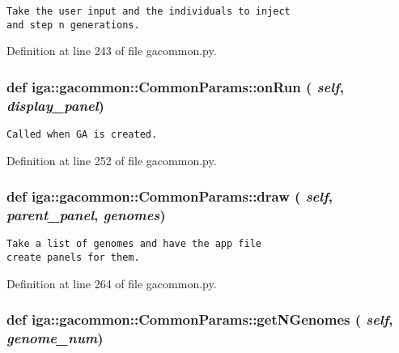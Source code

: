 \footnotesize\begin{verbatim}
Take the user input and the individuals to inject
and step n generations.
\end{verbatim}
\normalsize
 

Definition at line 243 of file gacommon.py.
\subsubsection{\setlength{\rightskip}{0pt plus 5cm}def iga::gacommon::CommonParams::onRun ( {\em self},  {\em display\_\-panel})}\label{classiga_1_1gacommon_1_1CommonParams_7383f6673e7687124dffaedf1a35f9b3}




\footnotesize\begin{verbatim}
Called when GA is created.
\end{verbatim}
\normalsize
 

Definition at line 252 of file gacommon.py.
\subsubsection{\setlength{\rightskip}{0pt plus 5cm}def iga::gacommon::CommonParams::draw ( {\em self},  {\em parent\_\-panel},  {\em genomes})}\label{classiga_1_1gacommon_1_1CommonParams_e33a52182911436bee817af6b574abb0}




\footnotesize\begin{verbatim}
Take a list of genomes and have the app file
create panels for them.
\end{verbatim}
\normalsize
 

Definition at line 264 of file gacommon.py.
\subsubsection{\setlength{\rightskip}{0pt plus 5cm}def iga::gacommon::CommonParams::getNGenomes ( {\em self},  {\em genome\_\-num})}\label{classiga_1_1gacommon_1_1CommonParams_eaab737d33f96f8282763eae25354eeb}




